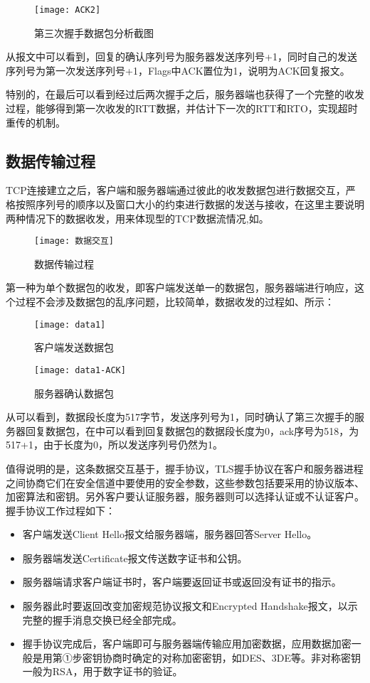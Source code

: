 \documentclass[lang=cn,11pt]{elegantpaper}
\begin{document}
\begin{figure}[htbp]
	\centering
	\texttt{[image: ACK2]}
	\caption{第三次握手数据包分析截图 \label{fig:7}}
\end{figure}

从报文中可以看到，回复的确认序列号为服务器发送序列号+1，同时自己的发送序列号为第一次发送序列号+1，Flags中ACK置位为1，说明为ACK回复报文。

特别的，在最后可以看到经过后两次握手之后，服务器端也获得了一个完整的收发过程，能够得到第一次收发的RTT数据，并估计下一次的RTT和RTO，实现超时重传的机制。

\subsection{数据传输过程}

TCP连接建立之后，客户端和服务器端通过彼此的收发数据包进行数据交互，严格按照序列号的顺序以及窗口大小的约束进行数据的发送与接收，在这里主要说明两种情况下的数据收发，用来体现型的TCP数据流情况,如。

\begin{figure}[htbp]
	\centering
	\texttt{[image: 数据交互]}
	\caption{数据传输过程 \label{fig:10}}
\end{figure}

第一种为单个数据包的收发，即客户端发送单一的数据包，服务器端进行响应，这个过程不会涉及数据包的乱序问题，比较简单，数据收发的过程如、所示：
\begin{figure}[htbp]
	\centering
	\texttt{[image: data1]}
	\caption{客户端发送数据包 \label{fig:8}}
	\centering
	\texttt{[image: data1-ACK]}
	\caption{服务器确认数据包 \label{fig:9}}
\end{figure}


从可以看到，数据段长度为517字节，发送序列号为1，同时确认了第三次握手的服务器回复数据包，在中可以看到回复数据包的数据段长度为0，ack序号为518，为517+1，由于长度为0，所以发送序列号仍然为1。


值得说明的是，这条数据交互基于，握手协议，TLS握手协议在客户和服务器进程之间协商它们在安全信道中要使用的安全参数，这些参数包括要采用的协议版本、加密算法和密钥。另外客户要认证服务器，服务器则可以选择认证或不认证客户。握手协议工作过程如下：

\begin{itemize}
	\item  客户端发送Client Hello报文给服务器端，服务器回答Server Hello。
	\item  服务器端发送Certificate报文传送数字证书和公钥。
	\item  服务器端请求客户端证书时，客户端要返回证书或返回没有证书的指示。
	\item  服务器此时要返回改变加密规范协议报文和Encrypted Handshake报文，以示完整的握手消息交换已经全部完成。
	\item  握手协议完成后，客户端即可与服务器端传输应用加密数据，应用数据加密一般是用第①步密钥协商时确定的对称加密密钥，如DES、3DE等。非对称密钥一般为RSA，用于数字证书的验证。
\end{itemize}
\end{document}

